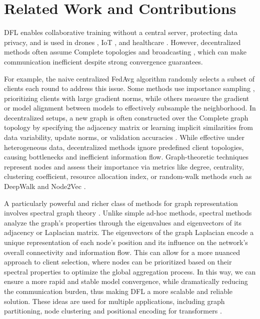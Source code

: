 \documentclass[journal]{IEEEtran}
\begin{document}
\section{Related Work and Contributions}
\label{sec:relwork}

DFL enables collaborative training without a central server, protecting data privacy, and is used in drones \cite{drones}, IoT \cite{iot}, and healthcare \cite{healthcare}. However, decentralized methods often assume Complete topologies and broadcasting \cite{DSGD}, which can make communication inefficient despite strong convergence guarantees.

For example, the naive centralized FedAvg algorithm \cite{FL} randomly selects a subset of clients each round to address this issue. Some methods use importance sampling \cite{imp_samp1, imp_samp2}, prioritizing clients with large gradient norms, while others measure the gradient or model alignment between models \cite{client_GRAD_sampling, client_GRAD_sampling2} to effectively subsample the neighborhood. In decentralized setups, a new graph is often constructed over the Complete graph topology by specifying the adjacency matrix or learning implicit similarities from data variability, update norms, or validation accuracies \cite{graph_select1, graph_select2}. While effective under heterogeneous data, decentralized methods ignore predefined client topologies, causing bottlenecks and inefficient information flow. Graph-theoretic techniques represent nodes and assess their importance via metrics like degree, centrality, clustering coefficient, resource allocation index, or random-walk methods such as DeepWalk \cite{deepwalk} and Node2Vec \cite{node2vec}.

A particularly powerful and richer class of methods for graph representation involves spectral graph theory \cite{graph_theory}. Unlike simple ad-hoc methods, spectral methods analyze the graph's properties through the eigenvalues and eigenvectors of its adjacency or Laplacian matrix. The eigenvectors of the graph Laplacian encode a unique representation of each node's position and its influence on the network's overall connectivity and information flow. This can allow for a more nuanced approach to client selection, where nodes can be prioritized based on their spectral properties to optimize the global aggregation process. In this way, we can ensure a more rapid and stable model convergence, while dramatically reducing the communication burden, thus making DFL a more scalable and reliable solution. These ideas are used for multiple applications, including graph partitioning, node clustering \cite{graph_theory} and positional encoding for transformers \cite{pos_emb}.
\end{document}
